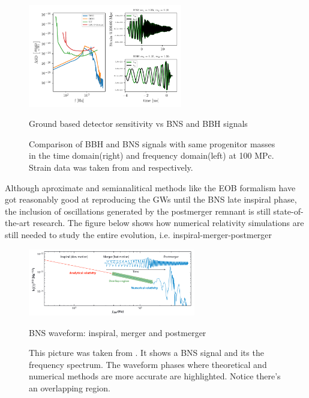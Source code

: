 \begin{figure}[hbt!]
\begin{center}
\includegraphics[width=0.6\textwidth, angle=0]{images/Data_analysis/sig_proc/BNS-BBH.pdf}
\captionsetup{width=0.8\textwidth}
\caption{Ground based detector sensitivity vs BNS and BBH signals}
\caption*{Comparison of BBH and BNS signals with same progenitor masses in the time domain(right) and frequency domain(left) at 100 MPc. Strain data was taken from \cite{Estelles:2020osj} and \cite{Dietrich:2018phi} respectively.}
\label{BBH and BNS}
\end{center}
\end{figure}

\FloatBarrier



Although aproximate and semianalitical methods like the EOB formalism \cite{Damour:2012yf,PhysRevD.96.121501,Dietrich:2018uni} have got reasonably good at reproducing the GWs until the BNS late inspiral phase, the inclusion of oscillations generated by the postmerger remnant is still state-of-the-art research. The figure below shows how numerical relativity simulations are still needed to study the entire evolution, i.e. inspiral-merger-postmerger



\begin{figure}[hbt!]
\begin{center}

\includegraphics[width=0.65\textwidth, angle=0]{images/postmerger.png}
\captionsetup{width=0.8\textwidth}
\caption{BNS waveform: inspiral, merger and postmerger}
\caption*{This picture was taken from \cite{Radice_2020}. It shows a BNS signal and its the frequency spectrum. The waveform phases where theoretical and numerical methods are more accurate are highlighted. Notice there's an overlapping region.}
\label{BBH and BNS2}
\end{center}
\end{figure}

